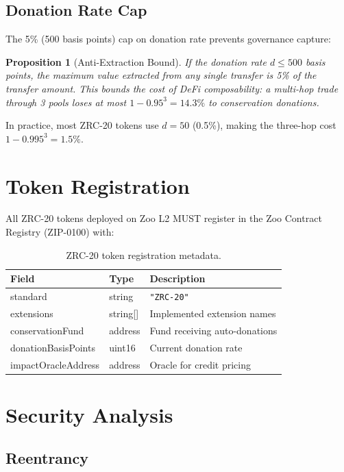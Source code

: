 \documentclass[11pt,letterpaper]{article}
\newtheorem{proposition}[theorem]{Proposition}
\begin{document}
\subsection{Donation Rate Cap}

The 5\% (500 basis points) cap on donation rate prevents governance capture:

\begin{proposition}[Anti-Extraction Bound]
If the donation rate $d \leq 500$ basis points, the maximum value extracted from any single transfer is 5\% of the transfer amount. This bounds the cost of DeFi composability: a multi-hop trade through 3 pools loses at most $1 - 0.95^3 = 14.3\%$ to conservation donations.
\end{proposition}

In practice, most ZRC-20 tokens use $d = 50$ (0.5\%), making the three-hop cost $1 - 0.995^3 = 1.5\%$.

\section{Token Registration}

All ZRC-20 tokens deployed on Zoo L2 MUST register in the Zoo Contract Registry (ZIP-0100) with:

\begin{table}[t]
\centering
\begin{tabular}{llp{5cm}}
\toprule
\textbf{Field} & \textbf{Type} & \textbf{Description} \\
\midrule
standard & string & \texttt{"ZRC-20"} \\
extensions & string[] & Implemented extension names \\
conservationFund & address & Fund receiving auto-donations \\
donationBasisPoints & uint16 & Current donation rate \\
impactOracleAddress & address & Oracle for credit pricing \\
\bottomrule
\end{tabular}
\caption{ZRC-20 token registration metadata.}
\label{tab:registration}
\end{table}

\section{Security Analysis}
\label{sec:security}

\subsection{Reentrancy}
\end{document}
